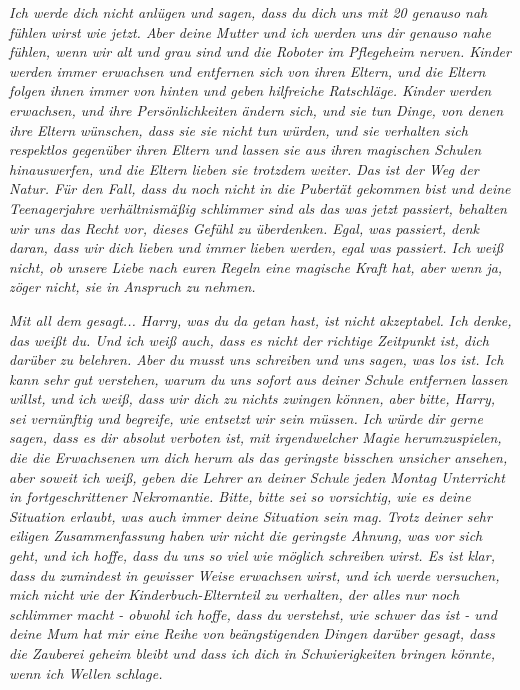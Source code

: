 \emph{Ich werde dich nicht anlügen und sagen, dass du dich uns mit 20 genauso
nah fühlen wirst wie jetzt. Aber deine Mutter und ich werden uns dir genauso
nahe fühlen, wenn wir alt und grau sind und die Roboter im Pflegeheim nerven.
Kinder werden immer erwachsen und entfernen sich von ihren Eltern, und die
Eltern folgen ihnen immer von hinten und geben hilfreiche Ratschläge. Kinder
werden erwachsen, und ihre Persönlichkeiten ändern sich, und sie tun Dinge, von
denen ihre Eltern wünschen, dass sie sie nicht tun würden, und sie verhalten
sich respektlos gegenüber ihren Eltern und lassen sie aus ihren magischen
Schulen hinauswerfen, und die Eltern lieben sie trotzdem weiter. Das ist der Weg
der Natur. Für den Fall, dass du noch nicht in die Pubertät gekommen bist und
deine Teenagerjahre verhältnismäßig schlimmer sind als das was jetzt passiert,
behalten wir uns das Recht vor, dieses Gefühl zu überdenken. Egal, was passiert,
denk daran, dass wir dich lieben und immer lieben werden, egal was passiert. Ich
weiß nicht, ob unsere Liebe nach euren Regeln eine magische Kraft hat, aber wenn
ja, zöger nicht, sie in Anspruch zu nehmen.}

\emph{Mit all dem gesagt... Harry, was du da getan hast, ist nicht akzeptabel.
Ich denke, das weißt du. Und ich weiß auch, dass es nicht der richtige Zeitpunkt
ist, dich darüber zu belehren. Aber du musst uns schreiben und uns sagen, was
los ist. Ich kann sehr gut verstehen, warum du uns sofort aus deiner Schule
entfernen lassen willst, und ich weiß, dass wir dich zu nichts zwingen können,
aber bitte, Harry, sei vernünftig und begreife, wie entsetzt wir sein müssen.
Ich würde dir gerne sagen, dass es dir absolut verboten ist, mit irgendwelcher
Magie herumzuspielen, die die Erwachsenen um dich herum als das geringste
bisschen unsicher ansehen, aber soweit ich weiß, geben die Lehrer an deiner
Schule jeden Montag Unterricht in fortgeschrittener Nekromantie. Bitte, bitte
sei so vorsichtig, wie es deine Situation erlaubt, was auch immer deine
Situation sein mag. Trotz deiner sehr eiligen Zusammenfassung haben wir nicht
die geringste Ahnung, was vor sich geht, und ich hoffe, dass du uns so viel wie
möglich schreiben wirst. Es ist klar, dass du zumindest in gewisser Weise
erwachsen wirst, und ich werde versuchen, mich nicht wie der
Kinderbuch-Elternteil zu verhalten, der alles nur noch schlimmer macht - obwohl
ich hoffe, dass du verstehst, wie schwer das ist - und deine Mum hat mir eine
Reihe von beängstigenden Dingen darüber gesagt, dass die Zauberei geheim bleibt
und dass ich dich in Schwierigkeiten bringen könnte, wenn ich Wellen schlage.}

